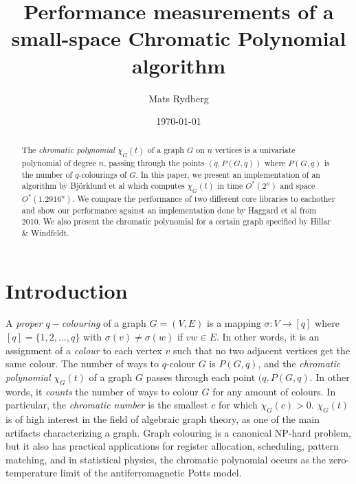 \documentclass[a4paper]{article}
\title{\huge{Performance measurements of a small-space Chromatic Polynomial algorithm}}
\author{Mats Rydberg}
\date{\today}
\begin{document}
\maketitle

\begin{abstract}
 The \emph{chromatic polynomial} $\chi_G(t)$ of a graph $G$ on $n$ vertices is a univariate polynomial of degree $n$, passing through the points $(q, P(G,q))$ where $P(G,q)$ is the number of $q$-colourings of $G$. In this paper, we present an implementation of an algorithm by Björklund et al which computes $\chi_G(t)$ in time $O^*(2^n)$ and space $O^*(1.2916^n)$. We compare the performance of two different core libraries to eachother and show our performance against an implementation done by Haggard et al from 2010. 
 We also present the chromatic polynomial for a certain graph specified by Hillar \& Windfeldt.
\end{abstract}

\newpage

\section{Introduction}

A \emph{proper $q-$colouring} of a graph $G = (V, E)$ is a mapping $\sigma: V \rightarrow [q]$ where $[q] = \{1,2,\ldots,q\}$ with $\sigma(v) \neq \sigma(w)$ if $vw \in E$. In other words, it is an assignment of a \emph{colour} to each vertex $v$ such that no two adjacent vertices get the same colour.
The number of ways to $q$-colour $G$ is $P(G,q)$, and the \emph{chromatic polynomial} $\chi_G(t)$ of a graph $G$ passes through each point $(q, P(G,q)$. In other words, it \emph{counts} the number of ways to colour $G$ for any amount of colours.
In particular, the \emph{chromatic number} is the smallest $c$ for which $\chi_G(c) > 0$. $\chi_G(t)$ is of high interest in the field of algebraic graph theory, as one of the main artifacts characterizing a graph. Graph colouring is a canonical NP-hard problem, but it also has practical applications for register allocation, scheduling, pattern matching, and in statistical physics, the chromatic polynomial occurs as the zero-temperature limit of the antiferromagnetic Potts model. \cite{chaitin} \cite{marx}

\end{document}

